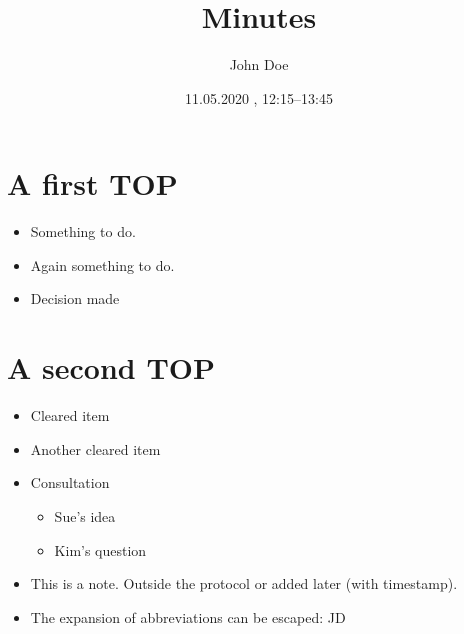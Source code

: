 \documentclass[11pt]{article}
\author{John Doe}
\date{11.05.2020 , 12:15--13:45}
\title{Minutes}
\begin{document}
\maketitle
\tableofcontents


\section{\texorpdfstring{}{}A first TOP}
\label{sec:orgaac495b}
\begin{itemize}
\item {} Something to do.
\item \ActionTag{}{::} \ActionTagMargin{}Again something to do.
\item \EntscheidungTag{}{::} \EntscheidungTagMargin{ }Decision made
\end{itemize}
\section{A second TOP}
\label{sec:orgd22c266}
\begin{itemize}
\item {} Cleared item
\item \ClearedTag{}{::} \ClearedTagMargin{ }Another cleared item
\item \ConsultationTag{}{::} \ConsultationTagMargin{ }Consultation 
\begin{itemize}
\item {}Sue's idea
\item {}Kim's question
\end{itemize}
\item \NoteTag{}{::}This is a note. Outside the protocol or added later (with timestamp).
\item The expansion of abbreviations can be escaped: JD
\end{itemize}
\end{document}
